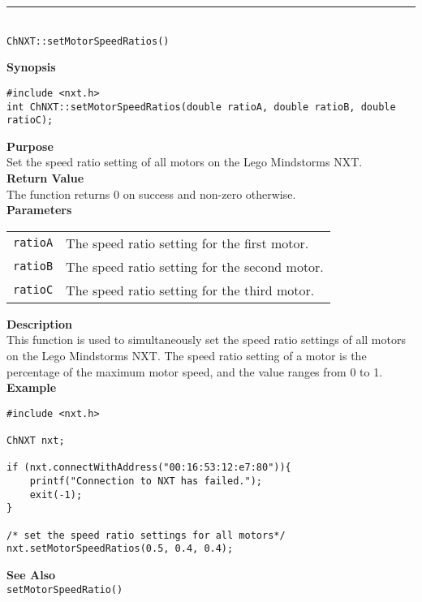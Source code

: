 \noindent
\vspace{5pt}
\rule{4.5in}{0.015in}\\
\noindent
{\LARGE \texttt{ChNXT::setMotorSpeedRatios()} }\\


\noindent
{\bf Synopsis}
\begin{lstlisting}
#include <nxt.h>
int ChNXT::setMotorSpeedRatios(double ratioA, double ratioB, double ratioC);
\end{lstlisting}

\noindent
{\bf Purpose}\\
Set the speed ratio setting of all motors on the Lego Mindstorms NXT.\\

\noindent
{\bf Return Value}\\
The function returns 0 on success and non-zero otherwise.\\

\noindent
{\bf Parameters}\\
\vspace{-0.1in}
\begin{description}
\item
\begin{tabular}{ p{20mm}p{135mm} }
\texttt{ratioA}&The speed ratio setting for the first motor.\\
\texttt{ratioB}&The speed ratio setting for the second motor.\\
\texttt{ratioC}&The speed ratio setting for the third motor.\\
\end{tabular}
\end{description}

\noindent
{\bf Description}\\
This function is used to simultaneously set the speed ratio settings 
of all motors on the Lego Mindstorms NXT. The speed ratio setting of
a motor is the percentage of the maximum motor speed, and the value 
ranges from 0 to 1.\\

\noindent
{\bf Example}
\begin{lstlisting}
#include <nxt.h> 

ChNXT nxt;

if (nxt.connectWithAddress("00:16:53:12:e7:80")){
    printf("Connection to NXT has failed.");
    exit(-1);
}
    
/* set the speed ratio settings for all motors*/
nxt.setMotorSpeedRatios(0.5, 0.4, 0.4);
\end{lstlisting}

\noindent
{\bf See Also}\\
\texttt{setMotorSpeedRatio()}\\
